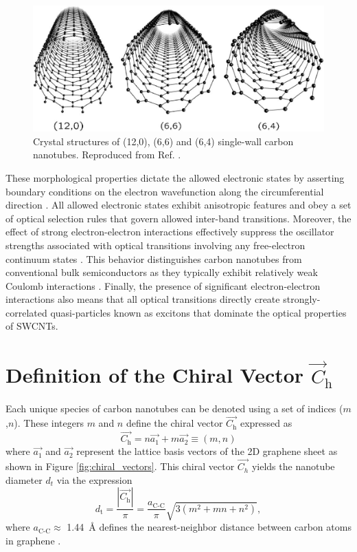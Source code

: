 \begin{figure}[h]
	\centering
	\includegraphics[scale=0.4]{images/chapter_optical_props/nanotube_symmetries_charlier}
	\caption{Crystal structures of (12,0), (6,6) and (6,4) single-wall carbon nanotubes. Reproduced from Ref. \cite{charlier2007electronic}.}
	\label{fig:symmetries}
\end{figure}
These morphological properties dictate the allowed electronic states by asserting boundary conditions on the electron wavefunction along the circumferential direction \cite{charlier2007electronic}. All allowed electronic states exhibit anisotropic features and obey a set of optical selection rules that govern allowed inter-band transitions. Moreover, the effect of strong electron-electron interactions effectively suppress the oscillator strengths associated with optical transitions involving any free-electron continuum states \cite{ando1997excitons}. This behavior distinguishes carbon nanotubes from conventional bulk semiconductors as they typically exhibit relatively weak Coulomb interactions \cite{ando1997excitons}. Finally, the presence of significant electron-electron interactions also means that all optical transitions directly create strongly-correlated quasi-particles known as excitons that dominate the optical properties of SWCNTs.


\section{Definition of the Chiral Vector $\vec{C}_\text{h}$}

Each unique species of carbon nanotubes can be denoted using a set of indices ($m$,$n$). These integers $m$ and $n$ define the chiral vector $\vec{C_\text{h} }$ expressed as
\begin{equation}
	\vec{C_\text{h}} = n {\vec{a_\text{1}}} + m {\vec{a_2}} \equiv (m,n)
	\label{eq:chiral_vec}
\end{equation}
where $\vec{a_\text{1}}$ and $\vec{a_\text{2}}$ represent the lattice basis vectors of the 2D graphene sheet as shown in Figure \ref{fig:chiral_vectors}. This chiral vector $\vec{C_h}$ yields the nanotube diameter $d_t$ via the expression
\begin{equation}
	d_\text{t} = \dfrac{|\vec{C_\text{h}}|}{\pi} = \dfrac{a_\text{C-C}}{\pi}\sqrt{3(m^2 + mn + n^2)},
\end{equation}
where $a_\text{C-C} \approx$ \SI{1.44}{\angstrom} defines the nearest-neighbor distance between carbon atoms in graphene \cite{nanot2013single}.

